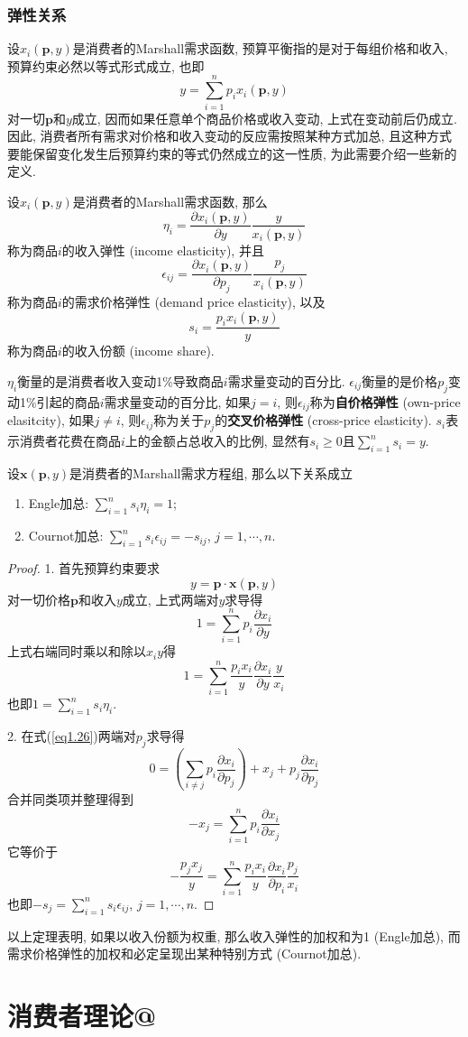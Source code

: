 \documentclass[cn, 12pt, math=mtpro2, bibstyle=apa, blue, twocol]{elegantbook}
\makeatletter
\newcommand*{\rom}[1]{\expandafter\@slowromancap\romannumeral #1@}
\newcommand{\p}{\mathbf{p}}
\newcommand{\x}{\mathbf{x}}
\makeatother
\begin{document}
\subsection{弹性关系}
设$x_i(\p,y)$是消费者的Marshall需求函数, 预算平衡指的是对于每组价格和收入, 预算约束必然以等式形式成立, 也即
$$y=\sum_{i=1}^{n}p_ix_i(\p,y)$$
对一切$\p$和$y$成立, 因而如果任意单个商品价格或收入变动, 上式在变动前后仍成立. 因此, 消费者所有需求对价格和收入变动的反应需按照某种方式加总, 且这种方式要能保留变化发生后预算约束的等式仍然成立的这一性质, 为此需要介绍一些新的定义.

\begin{definition}
设$x_i(\p,y)$是消费者的Marshall需求函数, 那么
$$\eta_i=\frac{\partial x_i(\p,y)}{\partial y}\frac{y}{x_i(\p,y)}$$
称为商品$i$的收入弹性 (income elasticity), 并且
$$\epsilon_{ij}=\frac{\partial x_i(\p,y)}{\partial p_j}\frac{p_j}{x_i(\p,y)}$$
称为商品$i$的需求价格弹性 (demand price elasticity), 以及
$$s_i=\frac{p_ix_i(\p,y)}{y}$$
称为商品$i$的收入份额 (income share).
\end{definition}

$\eta_i$衡量的是消费者收入变动1\%导致商品$i$需求量变动的百分比. $\epsilon_{ij}$衡量的是价格$p_j$变动1\%引起的商品$i$需求量变动的百分比, 如果$j=i$, 则$\epsilon_{ij}$称为\textbf{自价格弹性} (own-price elasitcity), 如果$j\ne i$, 则$\epsilon_{ij}$称为关于$p_j$的\textbf{交叉价格弹性} (cross-price elasticity). $s_i$表示消费者花费在商品$i$上的金额占总收入的比例, 显然有$s_i\ge0$且$\sum_{i=1}^{n}s_i=y$.

\begin{theorem}
  设$\x(\p,y)$是消费者的Marshall需求方程组, 那么以下关系成立
  \begin{enumerate}[label=\arabic*.]
    \item Engle加总: $\sum_{i=1}^{n}s_i\eta_i=1$;
    \item Cournot加总: $\sum_{i=1}^{n}s_i\epsilon_{ij}=-s_{ij}$, $j=1,\cdots,n$.
  \end{enumerate}
\end{theorem}
\begin{proof}
  1. 首先预算约束要求
  \begin{equation}\label{eq1.26}
    y=\p\cdot\x(\p,y)
  \end{equation}
  对一切价格$\p$和收入$y$成立, 上式两端对$y$求导得
  $$1=\sum_{i=1}^{n}p_i\frac{\partial x_i}{\partial y}$$
  上式右端同时乘以和除以$x_iy$得
  $$1=\sum_{i=1}^{n}\frac{p_ix_i}{y}\frac{\partial x_i}{\partial y}\frac{y}{x_i}$$
  也即$1=\sum_{i=1}^{n}s_i\eta_i$.
  
  2. 在式(\ref{eq1.26})两端对$p_j$求导得
  $$0=\left(\sum_{i\ne j}p_i\frac{\partial x_i}{\partial p_j}\right)+x_j+p_j\frac{\partial x_i}{\partial p_j}$$
  合并同类项并整理得到
  $$-x_j=\sum_{i=1}^{n}p_i\frac{\partial x_i}{\partial x_j}$$
  它等价于
  $$-\frac{p_jx_j}{y}=\sum_{i=1}^{n}\frac{p_ix_i}{y}\frac{\partial x_i}{\partial p_i}\frac{p_j}{x_i}$$
  也即$-s_j=\sum_{i=1}^{n}s_i\epsilon_{ij}$, $j=1,\cdots,n$.
\end{proof}
以上定理表明, 如果以收入份额为权重, 那么收入弹性的加权和为1 (Engle加总), 而需求价格弹性的加权和必定呈现出某种特别方式 (Cournot加总).
\chapter{消费者理论\rom{2}}
\end{document}
